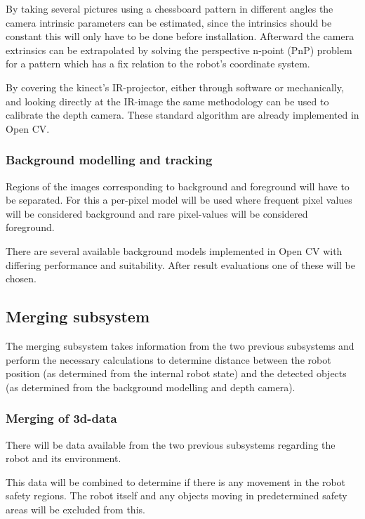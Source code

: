 \documentclass[10pt,a4paper,twocolumn,english]{article}
\begin{document}
By taking several pictures using a chessboard pattern in different angles the camera intrinsic parameters can be estimated, since the intrinsics should be constant this will only have to be done before installation. Afterward the camera extrinsics can be extrapolated by solving the perspective n-point (PnP) problem for a pattern which has a fix relation to the robot's coordinate system.

By covering the kinect's IR-projector, either through software or mechanically, and looking directly at the IR-image the same methodology can be used to calibrate the depth camera.
These standard algorithm are already implemented in Open CV.\cite{opencv-calibration}

\subsubsection{Background modelling and tracking}

Regions of the images corresponding to background and foreground will have to be separated. For this a per-pixel model will be used where frequent pixel values will be considered background and rare pixel-values will be considered foreground.

There are several available background models implemented in Open CV with differing performance and suitability. After result evaluations one of these will be chosen.

\subsection{Merging subsystem}

The merging subsystem takes information from the two previous subsystems and perform the necessary calculations to determine distance between the robot position (as determined from the internal robot state) and the detected objects (as determined from the background modelling and depth camera).

\subsubsection{Merging of 3d-data}

There will be data available from the two previous subsystems regarding the robot and its environment. 

This data will be combined to determine if there is any movement in the robot safety regions. The robot itself and any objects moving in predetermined safety areas will be excluded from this.
\end{document}
